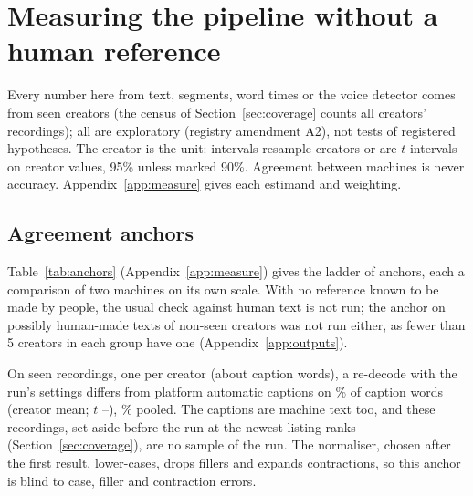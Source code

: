 
\section{Measuring the pipeline without a human reference}
\label{sec:measure}

Every number here from text, segments, word times or the voice detector comes from seen creators (the census of
Section~\ref{sec:coverage} counts all creators' recordings); all are exploratory (registry amendment A2), not tests of
registered hypotheses. The creator is the unit: intervals resample creators or are $t$ intervals on creator values,
95\% unless marked 90\%. Agreement between machines is never accuracy. Appendix~\ref{app:measure} gives each estimand
and weighting.

\subsection{Agreement anchors}
\label{sec:anchors}

Table~\ref{tab:anchors} (Appendix~\ref{app:measure}) gives the ladder of anchors, each a comparison of two machines on
its own scale. With no reference known to be made by people, the usual check against human text
\cite{proksch2019testing} is not run; the anchor on possibly human-made texts of non-seen creators was not run either,
as fewer than 5 creators in each group have one (Appendix~\ref{app:outputs}).

On \AnchorCaptionRecordings{} seen recordings, one per creator (about \AnchorCaptionWords{} caption words), a re-decode
with the run's settings differs from platform automatic captions on \AnchorCaptionMeanPct\% of caption words (creator
mean; $t$ \AnchorCaptionMeanTLo--\AnchorCaptionMeanTHi), \AnchorCaptionPooledPct\% pooled. The captions are machine
text too, and these recordings, set aside before the run at the newest listing ranks (Section~\ref{sec:coverage}), are
no sample of the run. The normaliser, chosen after the first result, lower-cases, drops fillers and expands
contractions, so this anchor is blind to case, filler and contraction errors.

